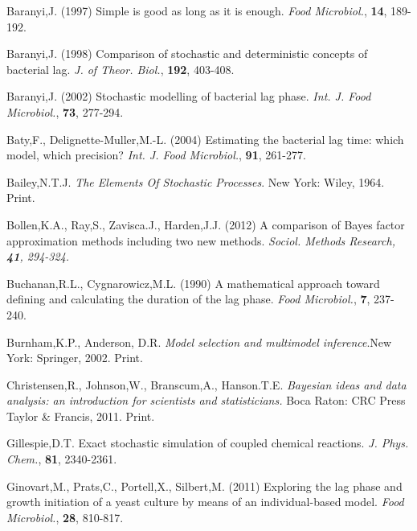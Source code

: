 \documentclass{bioinfo}
\begin{document}
\begin{thebibliography}{}
\vspace{-3em}
 Baranyi,J. (1997) Simple is good as long as it is enough. {\it Food Microbiol.}, {\bf 14}, 189-192. 

 Baranyi,J. (1998) Comparison of stochastic and deterministic concepts of bacterial lag. {\it J. of Theor. Biol.}, {\bf 192}, 403-408. 

 Baranyi,J. (2002) Stochastic modelling of bacterial lag phase. {\it Int. J. Food Microbiol.}, {\bf 73}, 277-294. 

 Baty,F., Delignette-Muller,M.-L. (2004) Estimating the bacterial lag time: which model, which precision? {\it Int. J. Food Microbiol.}, {\bf 91}, 261-277. 

 Bailey,N.T.J. \textit{The Elements Of Stochastic Processes}. New York: Wiley, 1964. Print.

 Bollen,K.A., Ray,S., Zavisca.J., Harden,J.J. (2012) A comparison of Bayes factor approximation methods including two new methods. \it{Sociol. Methods Research}, {\bf 41}, 294-324. 

 Buchanan,R.L., Cygnarowicz,M.L. (1990) A mathematical approach toward defining and calculating the duration of the lag phase. {\it Food Microbiol.}, {\bf 7}, 237-240.  

 Burnham,K.P., Anderson, D.R. \textit{Model selection and multimodel inference}.New York: Springer, 2002. Print. 

 Christensen,R., Johnson,W., Branscum,A., Hanson.T.E. {\it Bayesian ideas and data analysis: an introduction for scientists and statisticians.} Boca Raton: CRC Press Taylor \& Francis, 2011. Print. 

 Gillespie,D.T. Exact stochastic simulation of coupled chemical reactions. {\it J. Phys. Chem.}, {\bf 81}, 2340-2361. 


 Ginovart,M., Prats,C., Portell,X., Silbert,M. (2011) Exploring the lag phase and growth initiation of a yeast culture by means of an individual-based model. {\it Food Microbiol.}, {\bf 28}, 810-817. 


\end{thebibliography}
\end{document}
